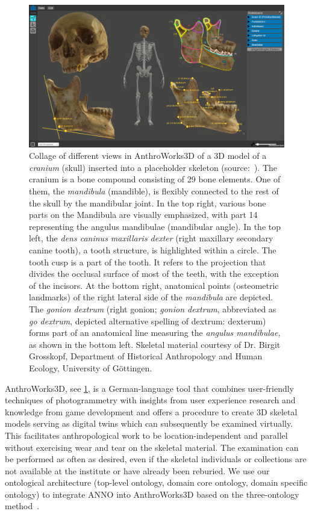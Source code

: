 \documentclass[sw]{iosart2x}
\newcommand{\aw}{AnthroWorks3D}
\begin{document}
\begin{figure}[h]
\includegraphics[width=\textwidth]{img/aw3d.png}
\caption{
Collage of different views in \aw{} of a 3D model of a \emph{cranium} (skull) inserted into a placeholder skeleton (source:~\cite{aw3dcidoc}).
The cranium is a bone compound consisting of 29 bone elements.
One of them, the \emph{mandibula} (mandible), is flexibly connected to the rest of the skull by the mandibular joint.
In the top right, various bone parts on the Mandibula are visually emphasized, with part 14 representing the angulus mandibulae (mandibular angle).
In the top left, the \emph{dens caninus maxillaris dexter} (right maxillary secondary canine tooth), a tooth structure, is highlighted within a circle.
The tooth cusp is a part of the tooth.
It refers to the projection that divides the occlusal surface of most of the teeth, with the exception of the incisors.
At the bottom right, anatomical points (osteometric landmarks) of the right lateral side of the \emph{mandibula} are depicted.
The \emph{gonion dextrum} (right gonion; \emph{gonion dextrum}, abbreviated as \emph{go dextrum}, depicted alternative spelling of dextrum: dexterum) forms part of an anatomical line measuring the \emph{angulus mandibulae},
as shown in the bottom left.
Skeletal material courtesy of Dr. Birgit Grosskopf, Department of Historical Anthropology and Human Ecology, University of Göttingen.
}
\label{fig:aw}
\end{figure}


\aw{}, see \cref{fig:aw}, is a German-language tool that combines user-friendly techniques of photogrammetry with insights from user experience research and knowledge from game development and offers a procedure to create 3D skeletal models serving as digital twins which can subsequently be examined virtually.
This facilitates anthropological work to be location-independent and parallel without exercising wear and tear on the skeletal material.
The examination can be performed as often as desired, even if the skeletal individuals or collections are not available at the institute or have already been reburied.
%
We use our ontological architecture (top-level ontology, domain core ontology, domain specific ontology) to integrate ANNO into \aw{} based on the three-ontology method~\cite{threeontologymethod}.
\end{document}
